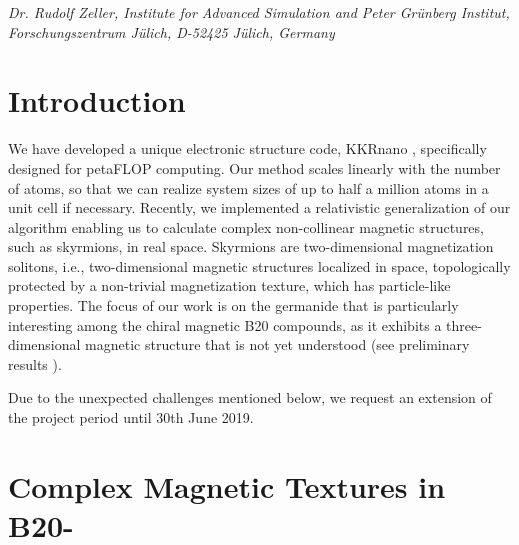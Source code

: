 \documentclass [a4paper, 12pt]{article}
\begin{document}
\phantom{MM} \textit{Dr. Rudolf Zeller,
Institute for Advanced Simulation and Peter Gr\"unberg Institut, Forschungszentrum J\"ulich, D-52425 J\"ulich, Germany
}



\newpage



\section{Introduction}
\label{sec:intro}
We have developed a unique electronic structure code, 
KKRnano \cite{zeller_towards_2008,thiess_massively_2012,bornemann_large-scale_nodate},
specifically designed for petaFLOP computing. Our method scales linearly
with the number of atoms, so that we can realize system sizes of up to 
half a million atoms in a unit cell if necessary.
Recently, we implemented a relativistic generalization of our algorithm 
enabling us to calculate complex non-collinear magnetic structures, such as skyrmions,
in real space. Skyrmions are two-dimensional magnetization solitons, i.e., two-dimensional
magnetic structures localized in space, topologically protected by a non-trivial
magnetization texture, which has particle-like properties. 
The focus of our work is on the germanide  that is particularly
interesting among the chiral magnetic B20 compounds, as it exhibits a three-dimensional magnetic structure
that is not yet understood (see preliminary results
\cite{tanigaki_real-space_2015,rybakov_new_2016,bornemann_investigation_2017,bornemann_large-scale_2018}).

Due to the unexpected challenges mentioned below,
we request an extension of the project period until 30th June 2019.


\section{Complex Magnetic Textures in B20-}
\label{sec:mnge}
\end{document}
